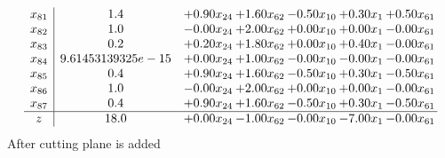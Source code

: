 \documentclass[8pt]{article}
\begin{document}
\[\begin{array}{c| c c@{\hskip 2pt} c@{\hskip 2pt} c@{\hskip 2pt} c@{\hskip 2pt} c@{\hskip 2pt} }
 x_{81}   &  1.4 & +  0.90 x_{24} & +  1.60 x_{62} & -0.50 x_{10} & +  0.30 x_{1} & +  0.50 x_{61}\\
 x_{82}   &  1.0 & -0.00 x_{24} & +  2.00 x_{62} & +  0.00 x_{10} & +  0.00 x_{1} & -0.00 x_{61}\\
 x_{83}   &  0.2 & +  0.20 x_{24} & +  1.80 x_{62} & +  0.00 x_{10} & +  0.40 x_{1} & -0.00 x_{61}\\
 x_{84}   &  9.61453139325e-15 & +  0.00 x_{24} & +  1.00 x_{62} & -0.00 x_{10} & -0.00 x_{1} & -0.00 x_{61}\\
 x_{85}   &  0.4 & +  0.90 x_{24} & +  1.60 x_{62} & -0.50 x_{10} & +  0.30 x_{1} & -0.50 x_{61}\\
 x_{86}   &  1.0 & -0.00 x_{24} & +  2.00 x_{62} & +  0.00 x_{10} & +  0.00 x_{1} & -0.00 x_{61}\\
 x_{87}   &  0.4 & +  0.90 x_{24} & +  1.60 x_{62} & -0.50 x_{10} & +  0.30 x_{1} & -0.50 x_{61}\\
\hline
z    &  18.0 & +  0.00 x_{24} & -1.00 x_{62} & -0.00 x_{10} & -7.00 x_{1} & -0.00 x_{61}\\
\end{array}\]
 After cutting plane is added 
\end{document}
